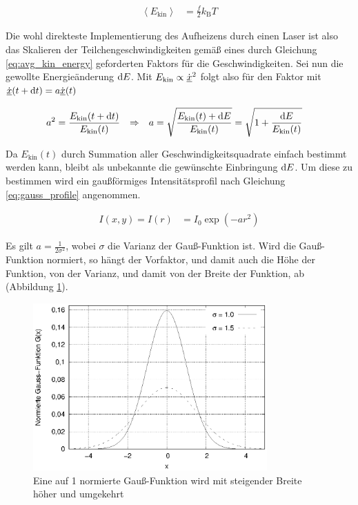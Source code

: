 		\begin{align}
			\left\langle E_\text{kin} \right\rangle &= \frac{f}{2} k_\text{B} T
				\label{eq:avg_kin_energy}
		\end{align}

		Die wohl direkteste Implementierung des Aufheizens durch einen Laser ist also das
		Skalieren der Teilchengeschwindigkeiten gemäß eines durch Gleichung
		\eqref{eq:avg_kin_energy} geforderten Faktors für die Geschwindigkeiten. Sei nun die
		gewollte Energieänderung $\dx[E]$. Mit $E_\text{kin} \propto \dot{\uvec{x}}^2$ folgt
		also für den Faktor mit $\dot{\uvec{x}}(t + \dt) = a\dot{\uvec{x}}(t)$

		\begin{align}
			a^2 &= \frac{E_\text{kin}(t + \dt)}{E_\text{kin}(t)}
			&\Rightarrow&&
			a &= \sqrt{\frac{E_\text{kin}(t) + \dx[E]}{E_\text{kin}(t)}}
				= \sqrt{1 + \frac{\dx[E]}{E_\text{kin}(t)}}
		\end{align}

		Da $E_\text{kin}(t)$ durch Summation aller Geschwindigkeitsquadrate einfach bestimmt
		werden kann, bleibt als unbekannte die gewünschte Einbringung $\dx[E]$. Um diese zu
		bestimmen wird ein gaußförmiges Intensitätsprofil nach Gleichung \eqref{eq:gauss_profile}
		angenommen.

		\begin{align}
			I(x,y) = I(r) &= I_0 \exp\left(-a r^2\right) \label{eq:gauss_profile}
		\end{align}

		Es gilt $a = \frac{1}{2\sigma^2}$, wobei $\sigma$ die Varianz der Gauß-Funktion ist.
		Wird die Gauß-Funktion normiert, so hängt der Vorfaktor, und damit auch die Höhe der
		Funktion, von der Varianz, und damit von der Breite der Funktion, ab
		(Abbildung \ref{fig:gauss}).

		\begin{figure}
			\centering
			\includegraphics[width=0.8\textwidth]{chapter/main/plt/gauss.eps}
			\caption{Eine auf 1 normierte Gauß-Funktion wird mit steigender Breite höher und
			umgekehrt}
			\label{fig:gauss}
		\end{figure}

